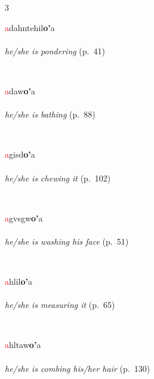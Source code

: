 \documentclass[oneside,openany]{book}%
\begin{document}
\noindent\begin{multicols}{3}%
\begin{minipage}[t]{\linewidth}
\raggedright\noindent \textcolor{Red}{a}dahntehil\textbf{o'}a\\
\\
\noindent \textit{he/she is pondering} (p.~41)
\end{minipage}\\[1em]%
\begin{minipage}[t]{\linewidth}
\raggedright\noindent \textcolor{Red}{a}daw\textbf{o'}a\\
\\
\noindent \textit{he/she is bathing} (p.~88)
\end{minipage}\\[1em]%
\begin{minipage}[t]{\linewidth}
\raggedright\noindent \textcolor{Red}{a}gisd\textbf{o'}a\\
\\
\noindent \textit{he/she is chewing it} (p.~102)
\end{minipage}\\[1em]%
\begin{minipage}[t]{\linewidth}
\raggedright\noindent \textcolor{Red}{a}gvsgw\textbf{o'}a\\
\\
\noindent \textit{he/she is washing his face} (p.~51)
\end{minipage}\\[1em]%
\begin{minipage}[t]{\linewidth}
\raggedright\noindent \textcolor{Red}{a}hlil\textbf{o'}a\\
\\
\noindent \textit{he/she is measuring it} (p.~65)
\end{minipage}\\[1em]%
\begin{minipage}[t]{\linewidth}
\raggedright\noindent \textcolor{Red}{a}hltaw\textbf{o'}a\\
\\
\noindent \textit{he/she is combing his/her hair} (p.~130)

\end{minipage}
\end{multicols}
\end{document}
